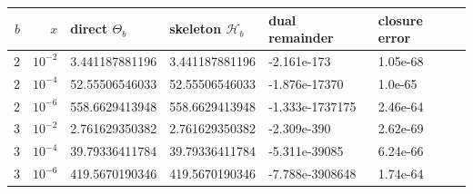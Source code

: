 \begin{tabular}{@{}rrllll@{}}
\toprule
$b$ & $x$ & direct $\Theta_b$ & skeleton $\mathcal H_b$ & dual remainder & closure error \\
\midrule
2 & $10^{-2}$ & 3.441187881196 & 3.441187881196 & -2.161e-173 & 1.05e-68 \\
2 & $10^{-4}$ & 52.55506546033 & 52.55506546033 & -1.876e-17370 & 1.0e-65 \\
2 & $10^{-6}$ & 558.6629413948 & 558.6629413948 & -1.333e-1737175 & 2.46e-64 \\
3 & $10^{-2}$ & 2.761629350382 & 2.761629350382 & -2.309e-390 & 2.62e-69 \\
3 & $10^{-4}$ & 39.79336411784 & 39.79336411784 & -5.311e-39085 & 6.24e-66 \\
3 & $10^{-6}$ & 419.5670190346 & 419.5670190346 & -7.788e-3908648 & 1.74e-64 \\
\bottomrule
\end{tabular}
